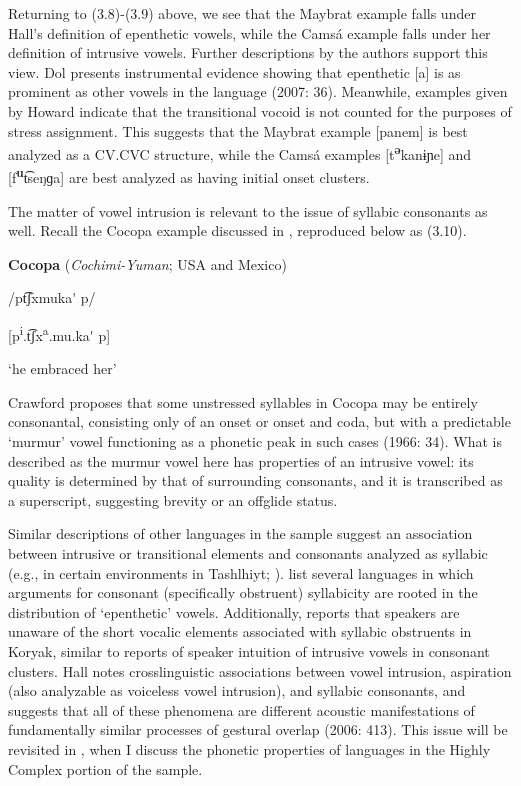   Returning to (3.8)-(3.9) above, we see that the Maybrat example falls under Hall’s definition of epenthetic vowels, while the Camsá example falls under her definition of intrusive vowels. Further descriptions by the authors support this view. Dol presents instrumental evidence showing that epenthetic [a] is as prominent as other vowels in the language (2007: 36). Meanwhile, examples given by Howard indicate that the transitional vocoid is not counted for the purposes of stress assignment. This suggests that the Maybrat example [panem] is best analyzed as a CV.CVC structure, while the Camsá examples [t\textbf{\textsuperscript{ə}}kanɨɲe] and [f\textbf{\textsuperscript{u}}t͡seŋɡa] are best analyzed as having initial onset clusters.

  The matter of vowel intrusion is relevant to the issue of syllabic consonants as well. Recall the Cocopa example discussed in , reproduced below as (3.10).

\ea\label{ex:(3.10)}
  \textbf{Cocopa} (\textit{Cochimi-Yuman}; USA and Mexico)

/pt͡ʃxmuka\'{} p/

[p\textsuperscript{i}.t͡ʃx\textsuperscript{a}.mu.ka\'{} p]

‘he embraced her’

\citep[43]{Crawford1966}
\z

Crawford proposes that some unstressed syllables in Cocopa may be entirely consonantal, consisting only of an onset or onset and coda, but with a predictable ‘murmur’ vowel functioning as a phonetic peak in such cases (1966: 34). What is described as the murmur vowel here has properties of an intrusive vowel: its quality is determined by that of surrounding consonants, and it is transcribed as a superscript, suggesting brevity or an offglide status.

  Similar descriptions of other languages in the sample suggest an association between intrusive or transitional elements and consonants analyzed as syllabic (e.g., in certain environments in Tashlhiyt; \citealt{DellElmedlaoui2002}). \citet{HargusBeavert2006} list several languages in which arguments for consonant (specifically obstruent) syllabicity are rooted in the distribution of ‘epenthetic’ vowels. Additionally, \citet[185-6]{Bell1978a} reports that speakers are unaware of the short vocalic elements associated with syllabic obstruents in Koryak, similar to reports of speaker intuition of intrusive vowels in consonant clusters. Hall notes crosslinguistic associations between vowel intrusion, aspiration (also analyzable as voiceless vowel intrusion), and syllabic consonants, and suggests that all of these phenomena are different acoustic manifestations of fundamentally similar processes of gestural overlap (2006: 413). This issue will be revisited in , when I discuss the phonetic properties of languages in the Highly Complex portion of the sample.

